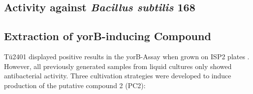 
    \subsection{Activity against \textit{Bacillus subtilis} 168} %
    \label{sub:activity_against_b_subtilis}


    \subsection{Extraction of yorB-inducing Compound} %
    \label{sub:extraction_of_yorb_inducing_compound}

    Tü2401 displayed positive results in the yorB-Assay  when grown on ISP2 plates .
    However, all previously generated samples from liquid cultures only showed antibacterial activity.
    Three cultivation strategies were developed to induce production of the putative compound 2 (PC2):

